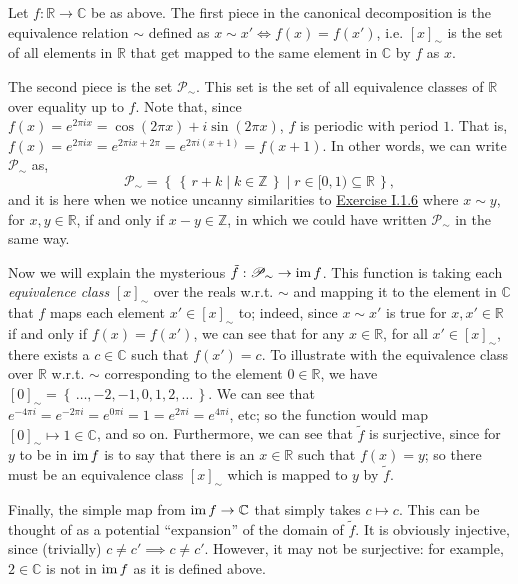 \documentclass[12pt,letterpaper,boxed]{hmcpset}
\newcommand{\im}{\mathrm{im}\hspace{1.5pt}}
\newcommand{\set}[1]{\left\{\,#1\,\right\}}
\begin{document}
\begin{solution}
	Let $f:\mathbb{R}\to\mathbb{C}$ be as above. The first piece in the canonical
	decomposition is the equivalence relation $\sim$ defined as $x \sim x' \iff f(x) =
	f(x')$, i.e. $[x]_{\sim}$ is the set of all elements in $\mathbb{R}$ that get
	mapped to the same element in $\mathbb{C}$ by $f$ as $x$.
	
	The second piece is the set $\mathscr{P}_{\sim}$. This set is the set of all
	equivalence classes of $\mathbb{R}$ over equality up to $f$. Note that, since
	$f(x) = e^{2\pi i x} = \cos(2\pi x) + i\sin(2\pi x)$, $f$ is periodic with
	period $1$. That is, $f(x) = e^{2\pi i x} = e^{2\pi i x + 2\pi} = e^{2\pi i (x +
		1)} = f(x+1)$. In other words, we can write $\mathscr{P}_{\sim}$ as,
	\[ \mathscr{P}_{\sim} = \set{\set{r + k\mid k\in\mathbb{Z}}\mid
		r\in[0,1)\subseteq\mathbb{R}}, \]
	and it is here when we notice uncanny similarities to \hyperlink{Exercise I.1.6}{Exercise I.1.6}
	where $x\sim y$, for $x,y\in\mathbb{R}$, if and only if $x-y\in\mathbb{Z}$, in
	which we could have written $\mathscr{P}_{\sim}$ in the same way. 
	
	Now we will explain the mysterious $\tilde{f}:\mathscr{P}_{\sim}\to\im f$. This
	function is taking each \textit{equivalence class} $[x]_{\sim}$ over the reals
	w.r.t. $\sim$ and mapping it to the element in $\mathbb{C}$ that $f$ maps each
	element $x'\in[x]_{\sim}$ to; indeed, since $x\sim x'$ is true for
	$x,x'\in\mathbb{R}$ if and only if $f(x)=f(x')$, we can see that for any
	$x\in\mathbb{R}$, for all $x'\in[x]_{\sim}$, there exists a $c\in\mathbb{C}$
	such that $f(x') = c$. To illustrate with the equivalence class over
	$\mathbb{R}$ w.r.t. $\sim$ corresponding to the element $0\in\mathbb{R}$, we
	have $[0]_{\sim} = \set{\dots, -2, -1, 0, 1, 2, \dots}$.  We can see that
	$e^{-4\pi i} = e^{-2\pi i} = e^{0\pi i} = 1 = e^{2\pi i} = e^{4\pi i}$, etc; so
	the function would map $[0]_{\sim}\mapsto1\in\mathbb{C}$, and so on.
	Furthermore, we can see that $\tilde{f}$ is surjective, since for $y$ to be in
	$\im f$ is to say that there is an $x\in\mathbb{R}$ such that $f(x) = y$; so
	there must be an equivalence class $[x]_{\sim}$ which is mapped to $y$ by
	$\tilde{f}$.
	
	Finally, the simple map from $\im f\to\mathbb{C}$ that simply takes $c\mapsto
	c$. This can be thought of as a potential ``expansion'' of the domain of
	$\tilde{f}$. It is obviously injective, since (trivially) $c\neq c'\implies
	c\neq c'$. However, it may not be surjective: for example, $2\in\mathbb{C}$ is
	not in $\im f$ as it is defined above.
\end{solution}
\end{document}
